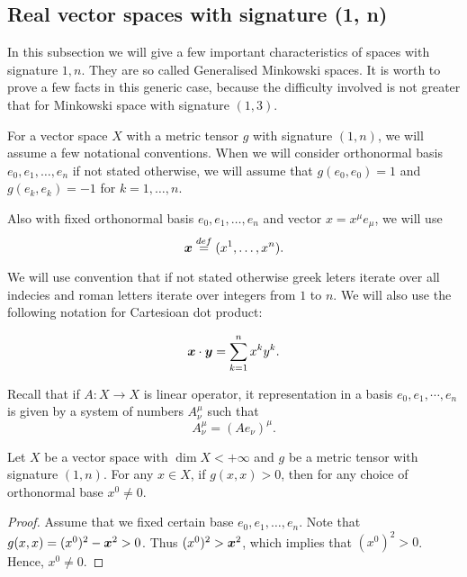 \documentclass[main.tex]{subfiles}
\begin{document}
\subsection{Real vector spaces with signature (1, n)}

In this subsection we will give a few important characteristics of spaces with signature $1, n$. They are so called Generalised Minkowski spaces. It is worth to prove a few facts in this generic case, because the difficulty involved is not greater that for Minkowski space with signature $(1, 3)$.

For a vector space $X$ with a metric tensor $g$ with signature $(1, n)$, we will assume a few notational conventions. When we will consider orthonormal basis $e_0, e_1, \dots, e_n$ if not stated otherwise, we will assume that 
$g(e_0, e_0) = 1$ and $g(e_k, e_k) = -1$ for $k = 1, \dots, n$.

Also with fixed orthonormal basis $e_0, e_1, \dots, e_n$ and vector $x = x^\mu e_\mu$, we will use
\begin{equation}
\boldsymbol{x}  \stackrel{def}{=} (x^1, \dots, x^n).
\end{equation}

We will use convention that if not stated otherwise greek leters iterate over all indecies and roman letters iterate over integers from $1$ to $n$. We will also use the following notation for Cartesioan dot product:

\begin{equation}
\boldsymbol{x}\cdot \boldsymbol{y} = \sum_{k=1}^n x^k y^k.
\end{equation}



Recall that if $A: X \to X$ is linear operator, it representation in a basis $e_0, e_1, \cdots, e_n$ is given by a system of numbers $A^\mu_\nu$ such that 
\begin{equation}
A^\mu_\nu = (Ae_\nu)^\mu.
\end{equation}

\begin{lemma}
\label{no-zero-time-if-time-like}
Let $X$ be a vector space with $\dim X < +\infty$ and $g$ be a metric tensor with signature $(1, n)$. For any $x\in X$, if $g(x, x) > 0$, then for any choice of orthonormal base $x^0\not= 0$.
\end{lemma}
\begin{proof}
Assume that we fixed certain base $e_0, e_1, \dots, e_n$. Note that $g(x, x) = (x^0)^2 - \boldsymbol{x}^2 > 0$. Thus $(x^0)^2 > \boldsymbol{x}^2$, which implies that $(x^0)^2 > 0$. Hence, $x^0 \not= 0$. 
\end{proof}
\end{document}
